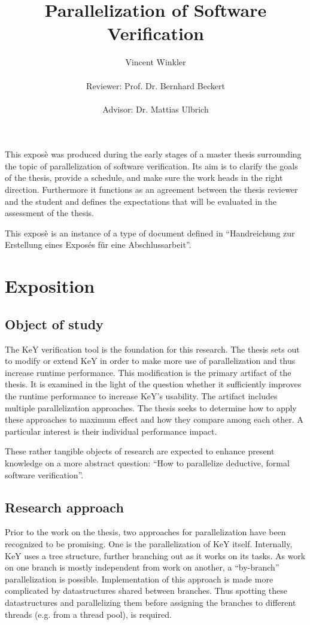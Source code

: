 \documentclass{scrartcl}
\title{Parallelization of Software Verification}
\author{
    Vincent Winkler\\
    \vspace{1em}\\
    Reviewer: Prof. Dr. Bernhard Beckert\\
    \vspace{1em}\\
    Advisor: Dr. Mattias Ulbrich
}
\begin{document}
\maketitle

This exposè was produced during the early stages of a master thesis
surrounding the topic of parallelization of software verification.
Its aim is to clarify the goals of the thesis, provide a schedule,
and make sure the work heads in the right direction.
Furthermore it functions as an agreement between the thesis reviewer and the student
and defines the expectations that will be evaluated in the assessment of the thesis.

This exposè is an instance of a type of document defined in
\enquote{Handreichung zur Erstellung eines Exposés für eine Abschlussarbeit}.

\section{Exposition}
\subsection{Object of study}
The KeY verification tool is the foundation for this research.
The thesis sets out to modify or extend KeY in order to make more use of parallelization
and thus increase runtime performance.
This modification is the primary artifact of the thesis.
It is examined in the light of the question whether it sufficiently improves the runtime
performance to increase KeY's usability.
The artifact includes multiple parallelization approaches.
The thesis seeks to determine how to apply these approaches to maximum effect
and how they compare among each other.
A particular interest is their individual performance impact.

These rather tangible objects of research are expected
to enhance present knowledge on a more abstract question:
\enquote{How to parallelize deductive, formal software verification}.

\subsection{Research approach}
Prior to the work on the thesis,
two approaches for parallelization have been recognized to be promising.
One is the parallelization of KeY itself.
Internally, KeY uses a tree structure, further branching out as it works on its tasks.
As work on one branch is mostly independent from work on another,
a \enquote{by-branch} parallelization is possible.
Implementation of this approach is made more complicated
by datastructures shared between branches.
Thus spotting these datastructures and parallelizing them
before assigning the branches to different threads (e.g. from a thread pool),
is required.
\end{document}
